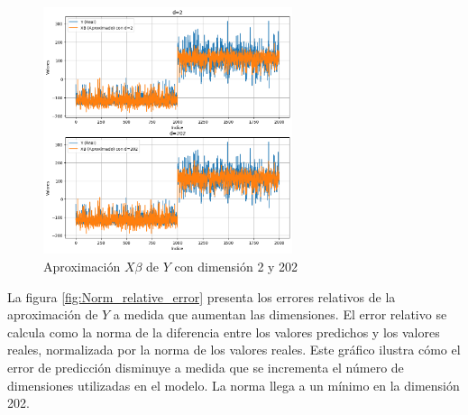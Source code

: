 \documentclass[12pt,a4]{article} %
\begin{document}
\begin{figure}[H]
    \centering
    \includegraphics[width=0.65\textwidth]{latex_project/plots1/worst _best.png}
    \caption{Aproximación $X\beta$ de $Y$ con dimensión 2 y 202}
    \label{fig:worst_best}
\end{figure}

La figura \ref{fig:Norm_relative_error} presenta los errores relativos de la aproximación de $Y$ a medida que aumentan las dimensiones. El error relativo se calcula como la norma de la diferencia entre los valores predichos y los valores reales, normalizada por la norma de los valores reales. Este gráfico ilustra cómo el error de predicción disminuye a medida que se incrementa el número de dimensiones utilizadas en el modelo. La norma llega a un mínimo en la dimensión 202.
\end{document}
